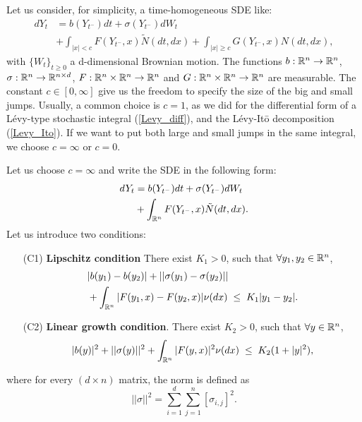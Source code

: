 Let us consider, for simplicity, a time-homogeneous SDE like:
\begin{align} \label{SDE}
 dY_t &= b(Y_{t^-} ) dt  + \sigma(Y_{t^-}) dW_t\\ \nonumber
     &+ \int_{|x|<c} F(Y_{t^-},x) \tilde N (dt,dx) + \int_{|x|\geq c} G(Y_{t^-},x) N(dt,dx),
\end{align}
with $\{W_t\}_{t\geq 0}$ a d-dimensional Brownian motion. 
The functions $b:\mathbb{R}^n \to \mathbb{R}^n$, $\sigma:\mathbb{R}^n \to \mathbb{R}^{n\times d}$, $F:\mathbb{R}^n\times \mathbb{R}^n \to \mathbb{R}^n$ and $G:\mathbb{R}^n \times \mathbb{R}^n \to \mathbb{R}^n$ are measurable. 
The constant $c \in [0,\infty]$ give us the freedom to specify the size of the big and small jumps.
Usually, a common choice is $c=1$, as we did for the differential form of a Lévy-type stochastic integral (\ref{Levy_diff}), and 
the Lévy-It\={o} decomposition (\ref{Levy_Ito}).
If we want to put both large and small jumps in the same integral, we choose $c = \infty$ or $c=0$.

Let us choose $c=\infty$ and write the SDE in the following form:
\begin{align} \label{modSDE}
 dY_t &= b(Y_{t^-}) dt  + \sigma(Y_{t^-}) dW_t\\ \nonumber
     &+ \int_{\mathbb{R}^n} F(Y_{t^-},x) \tilde N (dt,dx).
\end{align}
Let us introduce two conditions:
\begin{itemize}
 \item[(C1)] \textbf{Lipschitz condition} There exist $K_1 >0$, such that $\forall y_1,y_2 \in \mathbb{R}^n$,
 \begin{align}\label{Lipschitz}
  &|b(y_1) - b(y_2)| + || \sigma(y_1) - \sigma(y_2) ||  \\ 
  & + \int_{\R^n} |F(y_1,x)-F(y_2,x)| \nu(dx) \; \leq  \; K_1 |y_1-y_2|. \nonumber %
 \end{align}
 \item[(C2)] \textbf{Linear growth condition}. There exist $K_2>0$, such that $\forall y \in \mathbb{R}^n$,
 \begin{align}\label{Growth}
  |b(y)|^2 + ||\sigma(y)||^2 
   + \int_{\R^n} |F(y,x)|^2 \nu(dx) \; \leq \; K_2 (1+|y|^2),    %
 \end{align}
\end{itemize}
where for every $(d\times n)$ matrix, the norm is defined as
\begin{equation}
 || \sigma ||^2 = \sum_{i=1}^d \sum_{j=1}^n [\sigma_{i,j}]^2 .
\end{equation}

